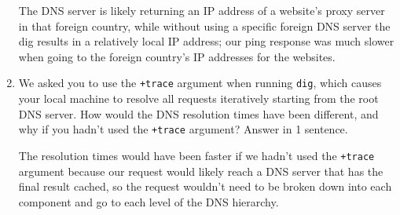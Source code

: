 \documentclass[10pt]{article}
\begin{document}
\begin{enumerate}
The DNS server is likely returning an IP address of a website's proxy server in that foreign country, while without using a specific foreign DNS server the dig results in a relatively local IP address; our ping response was much slower when going to the foreign country's IP addresses for the websites.

\item We asked you to use the \texttt{+trace} argument when running \texttt{dig}, which causes your local machine to resolve all requests iteratively starting from the root DNS server. How would the DNS resolution times have been different, and why if you hadn't used the \texttt{+trace} argument? Answer in 1 sentence.

The resolution times would have been faster if we hadn't used the \texttt{+trace} argument because our request would likely reach a DNS server that has the final result cached, so the request wouldn't need to be broken down into each component and go to each level of the DNS hierarchy. 

\end{enumerate}
\end{document}
